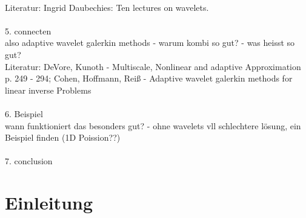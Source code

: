 \documentclass[a4paper,11pt,bibliography=totoc,listof=totoc,headinclude=true,cleardoublepage=empty,oneside]{scrbook}
\begin{document}
\\ Literatur: Ingrid Daubechies: Ten lectures on wavelets.
\\
\\  5. connecten 
\\ also adaptive wavelet galerkin methods - warum kombi so gut? - was heisst so gut? 
\\ Literatur: DeVore, Kunoth - Multiscale, Nonlinear and adaptive Approximation p. 249 - 294; Cohen, Hoffmann, Reiß - Adaptive wavelet galerkin methods for linear inverse Problems
\\
\\  6. Beispiel 
\\ wann funktioniert das besonders gut? - ohne wavelets vll schlechtere lösung, ein Beispiel finden (1D Poission??) 
\\
\\  7. conclusion


\chapter{Einleitung}
\label{chapter:introduction}
\end{document}
